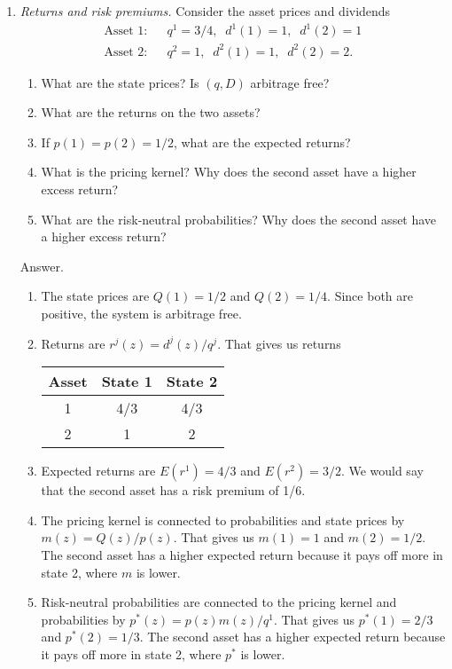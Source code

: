 \documentclass[11pt]{article}
\begin{document}
\begin{enumerate}
\item {\it Returns and risk premiums.\/}
Consider the asset prices and dividends
\begin{eqnarray*}
    \mbox{Asset 1:}&&  q^1 = 3/4, \;\; d^1(1) = 1, \;\; d^1(2) = 1 \\
    \mbox{Asset 2:}&&  q^2 = 1, \;\; d^2(1) = 1, \;\; d^2(2) = 2.
\end{eqnarray*}
\begin{enumerate}
\item What are the state prices? Is $(q,D)$ arbitrage free?
\item What are the returns on the two assets?
\item If $p(1) = p(2) = 1/2$, what are the expected returns?
\item What is the pricing kernel?
Why does the second asset have a higher excess return?
\item What are the risk-neutral probabilities?
Why does the second asset have a higher excess return?
\end{enumerate}
%
Answer.
\begin{enumerate}
\item The state prices are $Q(1) = 1/2$ and $Q(2) = 1/4$.
Since both are positive, the system is arbitrage free.
\item Returns are $r^j(z) = d^j(z)/q^j $.
That gives us returns

\begin{center}
\begin{tabular}{ccc}
\toprule
Asset &  State 1 & State 2 \\
\midrule
1     &  4/3  &   4/3  \\
2     &  1    &   2  \\
\bottomrule
\end{tabular}
\end{center}

\item Expected returns are
$ E(r^1) = 4/3$ and $E(r^2) = 3/2$.
We would say that the second asset has a risk premium of 1/6.

\item The pricing kernel is connected to probabilities and state
prices by $ m(z) = Q(z)/p(z)$.
That gives us $m(1) = 1$ and $m(2) = 1/2$.
The second asset has a higher expected return because it pays off more in state 2,
where $m$ is lower.

\item Risk-neutral probabilities
are connected to the pricing kernel and probabilities by
$ p^*(z) = p(z) m(z) /q^1 $.
That gives us $p^*(1) = 2/3$ and $p^*(2) = 1/3$.
The second asset has a higher expected return because it pays off more in state 2,
where $p^*$ is lower.


\end{enumerate}
\end{enumerate}
\end{document}
